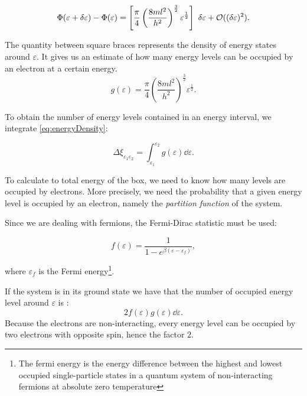 \documentclass[a4paper,12pt]{article}
\begin{document}
\begin{equation}
	\Phi(\varepsilon + \var{\varepsilon}) - \Phi(\varepsilon) = \left[ \frac{\pi}{4} \left( \frac{8 m l^2}{h^2} \right)^{\frac{3}{2}} \varepsilon^{\frac{1}{2}}  \right] ~ \var{\varepsilon} + \mathcal{O}((\var{\varepsilon})^2).
\end{equation}

The quantity between square braces represents the density of energy states around $\varepsilon$. 
It gives us an estimate of how many energy levels can be occupied by an electron at a certain energy.
\begin{equation}\label{eq:energyDensity}
	g(\varepsilon) =  \frac{\pi}{4} \left( \frac{8 m l^2}{h^2} \right)^{\frac{3}{2}} \varepsilon^{\frac{1}{2}}.
\end{equation}

To obtain the number of energy levels contained in an energy interval, we integrate \eqref{eq:energyDensity}:

\begin{equation}
	\Delta \xi_{\varepsilon_1 \varepsilon_2} = \int_{\varepsilon_1}^{\varepsilon_2} g(\varepsilon) \dd{\varepsilon}.
\end{equation}

To calculate to total energy of the box, we need to know how many levels are occupied by electrons. 
More precisely, we need the probability that a given energy level is occupied by an electron, namely the \textit{partition function} of the system. 

Since we are dealing with fermions, the Fermi-Dirac statistic must be used:

\begin{equation} \label{eq:fermiDiracPartitionFunction}
	f(\varepsilon) = \frac{1}{1 - e^{\beta (\varepsilon - \varepsilon_{f})}},
\end{equation}

where $\varepsilon_f$ is the Fermi energy\footnote{ The fermi energy is the energy difference between the highest and lowest occupied single-particle states in a quantum system of non-interacting fermions at absolute zero temperature}. 

If the system is in its ground state we have that the number of occupied energy level around $\varepsilon$ is :
\begin{equation}
	2 f(\varepsilon) g(\varepsilon) \dd{\varepsilon}.
\end{equation}
Because the electrons are non-interacting, every energy level can be occupied by two electrons with opposite spin, hence the factor $2$.
\end{document}
